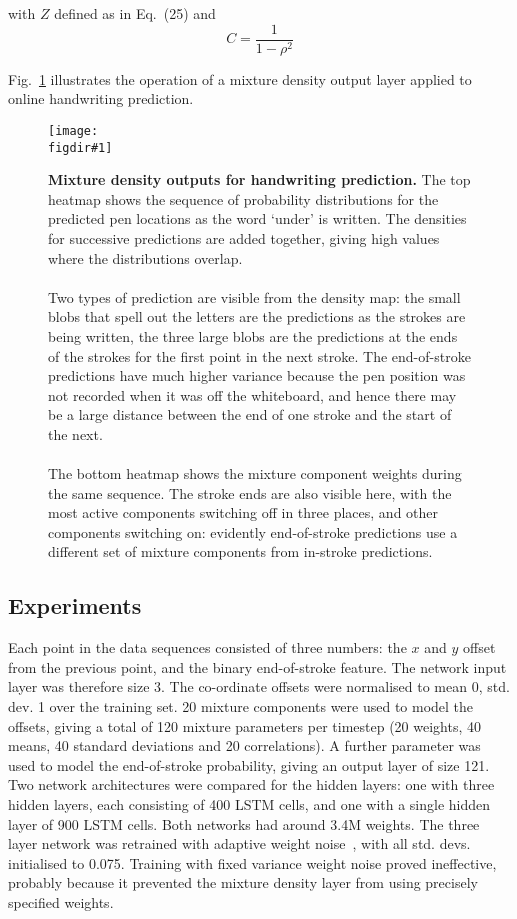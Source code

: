 \documentclass{article}
\newcommand{\flabel}[1]{\label{fig:#1}}
\newcommand{\fref}[1]{Fig.~\ref{fig:#1}}
\newcommand{\figdir}{}
\newcommand{\capt}[2]{\caption[#1]{\textbf{#1}#2}}
\newcommand{\fig}[5]
{
\begin{figure}
\begin{center}
\texttt{[image: \\figdir\#1]}
\end{center}
\capt{#4}{#5}
\flabel{#2}
\end{figure}
}
\begin{document}
with $Z$ defined as in Eq.~(25) and
\begin{equation}
C = \frac{1}{1- \rho^2}
\end{equation}

\fref{pred_density} illustrates the operation of a mixture density output layer applied to online handwriting prediction. 

\fig{pred_density}{pred_density}{1}{Mixture density outputs for handwriting prediction.}{ The top heatmap shows the sequence of probability distributions for the predicted pen locations as the word `under' is written. The densities for successive predictions are added together, giving high values where the distributions overlap.\\\\
Two types of prediction are visible from the density map: the small blobs that spell out the letters are the predictions as the strokes are being written, the three large blobs are the predictions at the ends of the strokes for the first point in the next stroke. The end-of-stroke predictions have much higher variance because the pen position was not recorded when it was off the whiteboard, and hence there may be a large distance between the end of one stroke and the start of the next. \\\\
The bottom heatmap shows the mixture component weights during the same sequence. The stroke ends are also visible here, with the most active components switching off in three places, and other components switching on: evidently end-of-stroke predictions use a different set of mixture components from in-stroke predictions.}

\subsection{Experiments}
Each point in the data sequences consisted of three numbers: the $x$ and $y$ offset from the previous point, and the binary end-of-stroke feature.
The network input layer was therefore size 3.
The co-ordinate offsets were normalised to mean 0, std. dev. 1 over the training set.
20 mixture components were used to model the offsets, giving a total of 120 mixture parameters per timestep (20 weights, 40 means, 40 standard deviations and 20 correlations).
A further parameter was used to model the end-of-stroke probability, giving an output layer of size 121.
Two network architectures were compared for the hidden layers: one with three hidden layers, each consisting of 400 LSTM cells, and one with a single hidden layer of 900 LSTM cells.
Both networks had around 3.4M weights.
The three layer network was retrained with adaptive weight noise~\cite{graves11nips}, with all std. devs. initialised to 0.075.
Training with fixed variance weight noise proved ineffective, probably because it prevented the mixture density layer from using precisely specified weights.
\end{document}
